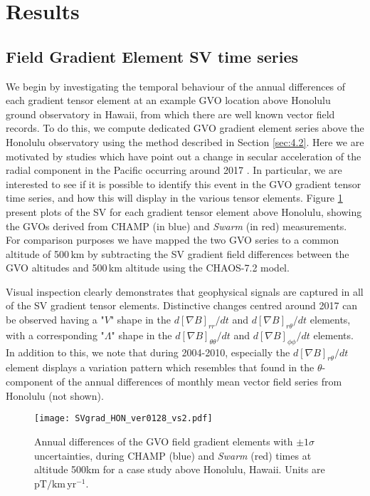 \documentclass[extra,mreferee]{gji}
\begin{document}
\section{Results}
\label{sec:5}
\subsection{Field Gradient Element SV time series}
\label{sec:5.1}
We begin by investigating the temporal behaviour of the annual differences of each gradient tensor element at an example GVO location above Honolulu ground observatory in Hawaii, from which there are well known vector field records. To do this, we compute dedicated GVO gradient element series above the Honolulu observatory using the method described in Section \ref{sec:4.2}. Here we are motivated by studies which have point out a change in secular acceleration of the radial component in the Pacific occurring around 2017 \citep{Sabaka_etal_2018,Finlay_etal_2020}. In particular, we are interested to see if it is possible to identify this event in the GVO gradient tensor time series, and how this will display in the various tensor elements. Figure \ref{Fig:7b} present plots of the SV for each gradient tensor element above Honolulu, showing the GVOs derived from CHAMP (in blue) and {\it Swarm} (in red) measurements. For comparison purposes we have mapped the two GVO series to a common altitude of 500\,km by subtracting  the SV gradient field differences between the GVO altitudes and 500\,km altitude using the CHAOS-7.2 model. 

Visual inspection clearly demonstrates that geophysical signals are captured in all of the SV gradient tensor elements. Distinctive changes centred around 2017 can be observed having a "$V$" shape in the $d\left[\nabla B\right]_{rr}/dt$ and $d\left[\nabla B\right]_{r \theta}/dt$ elements, with a corresponding "$\Lambda$" shape in the $d\left[\nabla B\right]_{\theta \theta}/dt$ and $d\left[\nabla B\right]_{\phi \phi}/dt$ elements. In addition to this, we note that during 2004-2010, especially the $d\left[\nabla B\right]_{r \theta}/dt$ element displays a variation pattern which resembles that found in the $\theta$-component of the annual differences of monthly mean vector field series from Honolulu (not shown).  
\begin{figure}
\centerline{\texttt{[image: SVgrad\_HON\_ver0128\_vs2.pdf]}}
\caption{Annual differences of the GVO field gradient elements with $\pm1 \sigma$ uncertainties, during CHAMP (blue) and {\it Swarm} (red) times at altitude 500km for a case study above Honolulu, Hawaii. Units are $\mathrm{pT}/\mathrm{km} \, \mathrm{yr}^{-1}$.}
\label{Fig:7b}
\end{figure} 
 
\end{document}
